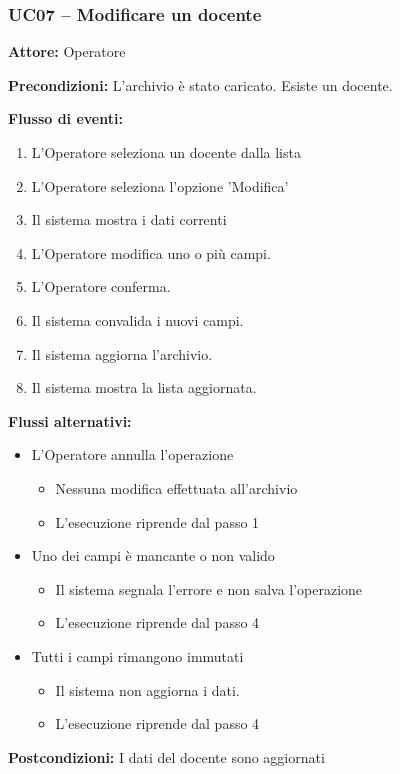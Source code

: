 \documentclass[a4paper,11pt]{article}
\begin{document}
\begin{samepage}
\subsubsection*{UC07 -- Modificare un docente}
\begin{ucbox}

\noindent\textbf{Attore:} Operatore\par
\noindent\textbf{Precondizioni:} L'archivio è stato caricato. Esiste un docente.\par

\noindent\textbf{Flusso di eventi:}
\begin{enumerate}
\item L'Operatore seleziona un docente dalla lista \item L'Operatore seleziona l'opzione 'Modifica' \item Il sistema mostra i dati correnti \item L'Operatore modifica uno o più campi. \item L'Operatore conferma. \item Il sistema convalida i nuovi campi. \item Il sistema aggiorna l'archivio. \item Il sistema mostra la lista aggiornata. \end{enumerate}
\noindent\textbf{Flussi alternativi:}
\begin{itemize}
\item[5a.] L'Operatore annulla l'operazione
\begin{itemize}
\item Nessuna modifica effettuata all'archivio
\item L'esecuzione riprende dal passo 1
\end{itemize}
\item[6a.] Uno dei campi è mancante o non valido
\begin{itemize}
\item Il sistema segnala l'errore e non salva l'operazione
\item L'esecuzione riprende dal passo 4
\end{itemize}
\item[6b.] Tutti i campi rimangono immutati
\begin{itemize}
\item Il sistema non aggiorna i dati.
\item L'esecuzione riprende dal passo 4
\end{itemize}
\end{itemize}
\noindent\textbf{Postcondizioni:} I dati del docente sono aggiornati\par
\end{ucbox}
\end{samepage}
\end{document}
